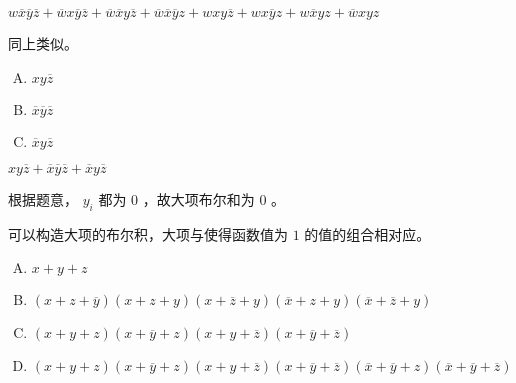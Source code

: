{{        %
        \begin{practices}
            $w\overline{x}\overline{y}\overline{z} + \overline{w}x\overline{y}\overline{z} + \overline{w}\overline{x}y\overline{z} + \overline{w}\overline{x}\overline{y}z + wxy\overline{z} + wx\overline{y}z + w\overline{x}yz + \overline{w}xyz$
        \end{practices}

        \begin{practices}
            同上类似。
        \end{practices}

        \begin{practices}
            \begin{enumerate}[A.]
                \item $xy\overline{z}$
                \item $\overline{x}\overline{y}\overline{z}$
                \item $\overline{x}y\overline{z}$
            \end{enumerate}
        \end{practices}

        \begin{practices}
            $xy\overline{z} + \overline{x}\overline{y}\overline{z} + \overline{x}y\overline{z}$
        \end{practices}

        \begin{practices}
            根据题意， $y_i$ 都为 $0$ ，故大项布尔和为 $0$ 。
        \end{practices}

        \begin{practices}
            可以构造大项的布尔积，大项与使得函数值为 $1$ 的值的组合相对应。
        \end{practices}

        \begin{practices}
            \begin{enumerate}[A.]
                \item $x + y + z$
                \item $(x + z + \overline{y})(x + z + y)(x + \overline{z} + y)(\overline{x} + z + y)(\overline{x} + \overline{z} + y)$
                \item $(x + y + z)(x + \overline{y} + z)(x + y + \overline{z})(x + \overline{y} + \overline{z})$
                \item $(x + y + z)(x + \overline{y} + z)(x + y + \overline{z})(x + \overline{y} + \overline{z})(\overline{x} + \overline{y} + z)(\overline{x} + \overline{y} + \overline{z})$
            \end{enumerate}
        \end{practices}

}}
